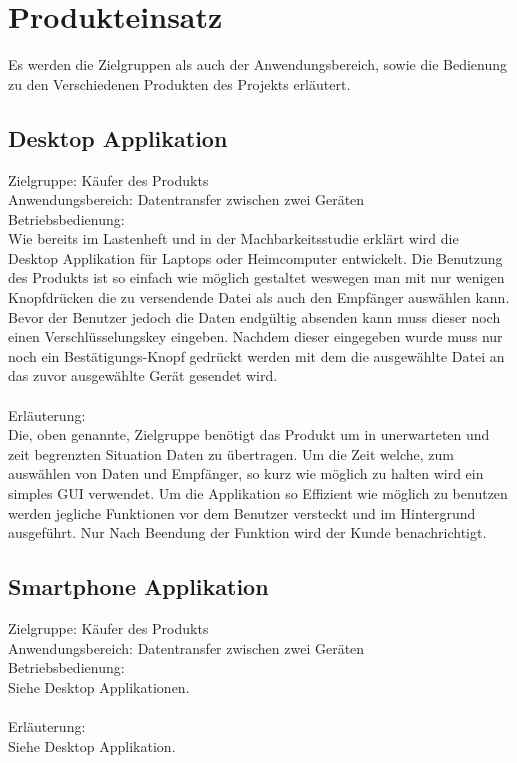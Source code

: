 \section{Produkteinsatz}
Es werden die Zielgruppen als auch der Anwendungsbereich, sowie die Bedienung zu den Verschiedenen Produkten des Projekts erläutert.
\subsection{Desktop Applikation}
Zielgruppe: Käufer des Produkts
\\
Anwendungsbereich: Datentransfer zwischen zwei Geräten
\\
Betriebsbedienung:
\\
Wie bereits im Lastenheft und in der Machbarkeitsstudie erklärt wird die Desktop Applikation für Laptops oder Heimcomputer entwickelt. Die Benutzung des Produkts ist so einfach wie möglich gestaltet weswegen man mit nur wenigen Knopfdrücken die zu versendende Datei als auch den Empfänger auswählen kann. Bevor der Benutzer jedoch die Daten endgültig absenden kann muss dieser noch einen Verschlüsselungskey eingeben. Nachdem dieser eingegeben wurde muss nur noch ein Bestätigungs-Knopf gedrückt werden mit dem die ausgewählte Datei an das zuvor ausgewählte Gerät gesendet wird.
\\\\
Erläuterung:
\\
Die, oben genannte, Zielgruppe benötigt das Produkt um in unerwarteten und zeit begrenzten Situation Daten zu übertragen. Um die Zeit welche, zum auswählen von Daten und Empfänger, so kurz wie möglich zu halten wird ein simples GUI verwendet. Um die Applikation so Effizient wie möglich zu benutzen werden jegliche Funktionen vor dem Benutzer versteckt und im Hintergrund ausgeführt. Nur Nach Beendung der Funktion wird der Kunde benachrichtigt.
\subsection{Smartphone Applikation}
Zielgruppe: Käufer des Produkts
\\
Anwendungsbereich: Datentransfer zwischen zwei Geräten
\\
Betriebsbedienung:
\\
Siehe Desktop Applikationen.
\\\\
Erläuterung:
\\
Siehe Desktop Applikation.
